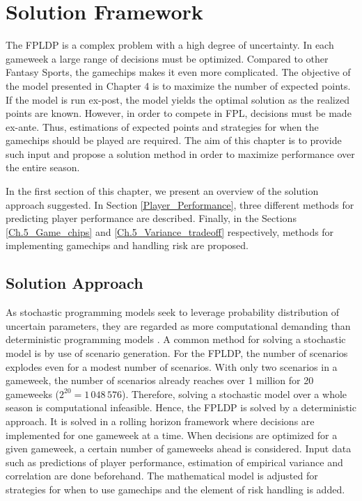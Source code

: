 

\chapter{Solution Framework} \label{chapter_solution_approach}

The FPLDP is a complex problem with a high degree of uncertainty. In each gameweek a large range of decisions must be optimized. Compared to other Fantasy Sports, the gamechips makes it even more complicated. The objective of the model presented in Chapter 4 is to maximize the number of expected points. If the model is run ex-post, the model yields the optimal solution as the realized points are known. However, in order to compete in FPL, decisions must be made ex-ante. Thus, estimations of expected points and strategies for when the gamechips should be played are required. The aim of this chapter is to provide such input and propose a solution method in order to maximize performance over the entire season. 

\newpar
In the first section of this chapter, we present an overview of the solution approach suggested. In Section \ref{Player_Performance}, three different methods for predicting player performance are described. Finally, in the Sections \ref{Ch.5_Game_chips} and \ref{Ch.5_Variance_tradeoff} respectively, methods for implementing gamechips and handling risk are proposed.


\section{Solution Approach}

As stochastic programming models seek to leverage probability distribution of uncertain parameters, they are regarded as more computational demanding than deterministic programming models \citep{Shapiro}. A common method for solving a stochastic model is by use of scenario generation. For the FPLDP, the number of scenarios explodes even for a modest number of scenarios. With only two scenarios in a gameweek, the number of scenarios already reaches over 1 million for 20 gameweeks ($2^{20} = 1\,048\,576$). Therefore, solving a stochastic model over a whole season is computational infeasible. Hence, the FPLDP is solved by a deterministic approach. It is solved in a rolling horizon framework where decisions are implemented for one gameweek at a time. When decisions are optimized for a given gameweek, a certain number of gameweeks ahead is considered. Input data such as predictions of player performance, estimation of empirical variance and correlation are done beforehand. The mathematical model is adjusted for strategies for when to use gamechips and the element of risk handling is added. 

